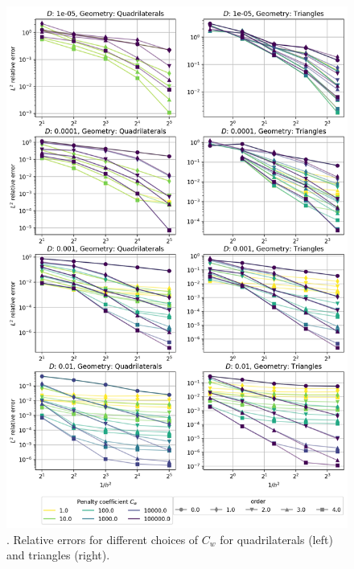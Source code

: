 \begin{figure}[p!]
	\centering
	\includegraphics[height=\textheight]{../figs/parametric/advdiff_2D/quarteroni2.png}
	\caption{. Relative errors for different choices of $C_w$ for
	quadrilaterals (left) and triangles (right).}
	\label{fig:conv_qart2}
\end{figure}

